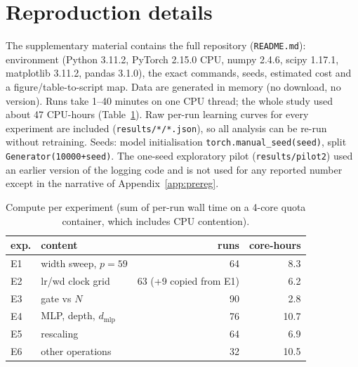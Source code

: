 \documentclass{article} %
\newcommand{\tfit}{t_{\mathrm{fit}}}
\newcommand{\tgen}{t_{\mathrm{gen}}}
\begin{document}
\begin{table}[h]
\caption{Rescaling intervention (E5), 4 seeds per cell, $c{=}1$ from E1 (same seeds). Delay $=\tgen-\tfit$ (median over generalising runs).}
\label{tab:e5}
\begin{center}\small

\end{center}
\end{table}

\section{Reproduction details}
\label{app:repro}
The supplementary material contains the full repository (\texttt{README.md}): environment (Python 3.11.2, PyTorch 2.15.0 CPU, numpy 2.4.6, scipy 1.17.1, matplotlib 3.11.2, pandas 3.1.0), the exact commands, seeds, estimated cost and a figure/table-to-script map. Data are generated in memory (no download, no version). Runs take 1--40 minutes on one CPU thread; the whole study used about 47 CPU-hours (Table~\ref{tab:cost}). Raw per-run learning curves for every experiment are included (\texttt{results/*/*.json}), so all analysis can be re-run without retraining. Seeds: model initialisation \texttt{torch.manual\_seed(seed)}, split \texttt{Generator(10000+seed)}. The one-seed exploratory pilot (\texttt{results/pilot2}) used an earlier version of the logging code and is not used for any reported number except in the narrative of Appendix~\ref{app:prereg}.

\begin{table}[h]
\caption{Compute per experiment (sum of per-run wall time on a 4-core quota container, which includes CPU contention).}
\label{tab:cost}
\begin{center}\small
\begin{tabular}{llrr}
\toprule
exp. & content & runs & core-hours\\
\midrule
E1 & width sweep, $p{=}59$ & 64 & 8.3\\
E2 & lr/wd clock grid & 63 (+9 copied from E1) & 6.2\\
E3 & gate vs $N$ & 90 & 2.8\\
E4 & MLP, depth, $d_{\mathrm{mlp}}$ & 76 & 10.7\\
E5 & rescaling & 64 & 6.9\\
E6 & other operations & 32 & 10.5\\
\bottomrule
\end{tabular}
\end{center}
\end{table}
\end{document}
